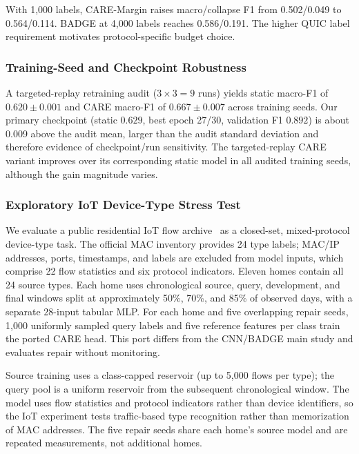 \documentclass[journal]{IEEEtran}
\begin{document}
With 1{,}000 labels, CARE-Margin raises macro/collapse F1 from 0.502/0.049 to 0.564/0.114. BADGE at 4{,}000 labels reaches 0.586/0.191. The higher QUIC label requirement motivates protocol-specific budget choice.

\subsubsection{Training-Seed and Checkpoint Robustness}
\label{sec:checkpoint_robustness}

A targeted-replay retraining audit ($3{\times}3{=}9$ runs) yields static macro-F1 of $0.620{\pm}0.001$ and CARE macro-F1 of $0.667{\pm}0.007$ across training seeds.
Our primary checkpoint (static $0.629$, best epoch 27/30, validation F1 $0.892$) is about 0.009 above the audit mean, larger than the audit standard deviation and therefore evidence of checkpoint/run sensitivity. The targeted-replay CARE variant improves over its corresponding static model in all audited training seeds, although the gain magnitude varies.

\subsubsection{Exploratory IoT Device-Type Stress Test}
\label{sec:iot_homes}


We evaluate a public residential IoT flow archive~\cite{pashamokhtari2023dynamic} as a closed-set, mixed-protocol device-type task. The official MAC inventory provides 24 type labels; MAC/IP addresses, ports, timestamps, and labels are excluded from model inputs, which comprise 22 flow statistics and six protocol indicators. Eleven homes contain all 24 source types. Each home uses chronological source, query, development, and final windows split at approximately 50\%, 70\%, and 85\% of observed days, with a separate 28-input tabular MLP. For each home and five overlapping repair seeds, 1{,}000 uniformly sampled query labels and five reference features per class train the ported CARE head. This port differs from the CNN/BADGE main study and evaluates repair without monitoring.

Source training uses a class-capped reservoir (up to 5{,}000 flows per type); the query pool is a uniform reservoir from the subsequent chronological window. The model uses flow statistics and protocol indicators rather than device identifiers, so the IoT experiment tests traffic-based type recognition rather than memorization of MAC addresses. The five repair seeds share each home's source model and are repeated measurements, not additional homes.
\end{document}
